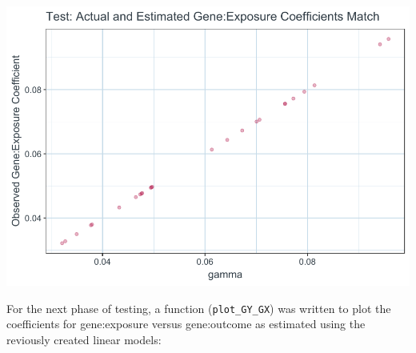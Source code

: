 \documentclass[
]{article}
\begin{document}
\includegraphics{9_Test_Appendices_files/figure-latex/test-plot-gamma-1-1.pdf}

For the next phase of testing, a function (\texttt{plot\_GY\_GX}) was written to plot the coefficients for gene:exposure versus gene:outcome as estimated using the reviously created linear models:
\end{document}
